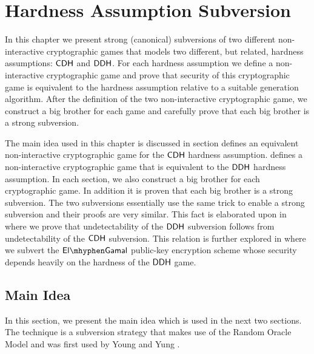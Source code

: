 \chapter{Hardness Assumption Subversion}

In this chapter we present strong (canonical) subversions of two different non-interactive cryptographic games that models two different, but related, hardness assumptions: $\mathsf{CDH}$ and $\mathsf{DDH}$. For each hardness assumption we define a non-interactive cryptographic game and prove that security of this cryptographic game is equivalent to the hardness assumption relative to a suitable generation algorithm. After the definition of the two non-interactive cryptographic game, we construct a big brother for each game and carefully prove that each big brother is a strong subversion.  

The main idea used in this chapter is discussed in section  defines an equivalent non-interactive cryptographic game for the $\mathsf{CDH}$ hardness assumption.  defines a non-interactive cryptographic game that is equivalent to the $\mathsf{DDH}$ hardness assumption. In each section, we also construct a big brother for each cryptographic game. In addition it is proven that each big brother is a strong subversion. The two subversions essentially use the same trick to enable a strong subversion and their proofs are very similar. This fact is elaborated upon in  where we prove that undetectability of the $\mathsf{DDH}$ subversion follows from undetectability of the $\mathsf{CDH}$ subversion. This relation is further explored in  where we subvert the $\elGamal$ public-key encryption scheme whose security depends heavily on the hardness of the $\mathsf{DDH}$ game.  

\section{Main Idea}

In this section, we present the main idea which is used in the next two sections. The technique is a subversion strategy that makes use of the Random Oracle Model and was first used by Young and Yung \cite{DBLP:conf/crypto/YoungY96}. 

